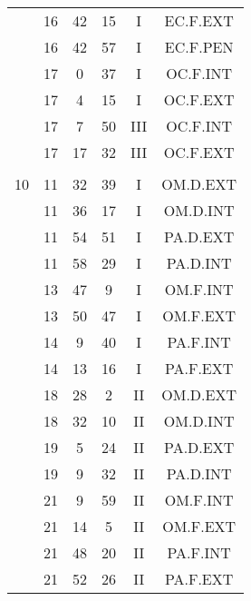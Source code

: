 \documentclass[12pt, a4paper]{article}
\begin{document}
\begin{multicols}{3}
{\begin{tabular}{c c c c c c}
	 	 	 	 & 16 & 42 & 15 & I & EC.F.EXT\\%
	 	 	 	 & 16 & 42 & 57 & I & EC.F.PEN\\%
	 	 	 	 & 17 & 0 & 37 & I & OC.F.INT\\%
	 	 	 	 & 17 & 4 & 15 & I & OC.F.EXT\\%
	 	 	 	 & 17 & 7 & 50 & III & OC.F.INT\\%
	 	 	 	 & 17 & 17 & 32 & III & OC.F.EXT\\%
	 	 	 	 & & & & & \\%
	 	 	 	10 & 11 & 32 & 39 & I & OM.D.EXT\\%
	 	 	 	 & 11 & 36 & 17 & I & OM.D.INT\\%
	 	 	 	 & 11 & 54 & 51 & I & PA.D.EXT\\%
	 	 	 	 & 11 & 58 & 29 & I & PA.D.INT\\%
	 	 	 	 & 13 & 47 & 9 & I & OM.F.INT\\%
	 	 	 	 & 13 & 50 & 47 & I & OM.F.EXT\\%
	 	 	 	 & 14 & 9 & 40 & I & PA.F.INT\\%
	 	 	 	 & 14 & 13 & 16 & I & PA.F.EXT\\%
	 	 	 	 & 18 & 28 & 2 & II & OM.D.EXT\\%
	 	 	 	 & 18 & 32 & 10 & II & OM.D.INT\\%
	 	 	 	 & 19 & 5 & 24 & II & PA.D.EXT\\%
	 	 	 	 & 19 & 9 & 32 & II & PA.D.INT\\%
	 	 	 	 & 21 & 9 & 59 & II & OM.F.INT\\%
	 	 	 	 & 21 & 14 & 5 & II & OM.F.EXT\\%
	 	 	 	 & 21 & 48 & 20 & II & PA.F.INT\\%
	 	 	 	 & 21 & 52 & 26 & II & PA.F.EXT\\%

\end{tabular}}
\end{multicols}
\end{document}

